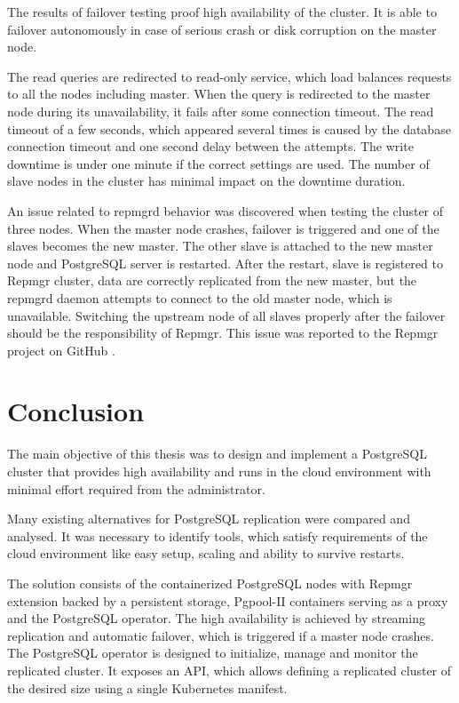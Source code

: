 \documentclass[
  digital, %
  twoside, %
  table,   %
  lof,     %
  lot,     %
]{fithesis3}
\begin{document}
The results of failover testing proof high availability of the cluster. It is able to failover autonomously in case of serious crash or disk corruption on the master node.

The read queries are redirected to read-only service, which load balances requests to all the nodes including master. When the query is redirected to the master node during its unavailability, it fails after some connection timeout.
The read timeout of a few seconds, which appeared several times is caused by the database connection timeout and one second delay between the attempts. The write downtime is under one minute if the correct settings are used. The number of slave nodes in the cluster has minimal impact on the downtime duration.

An issue related to repmgrd behavior was discovered when testing the cluster of three nodes. When the master node crashes, failover is triggered and one of the slaves becomes the new master. The other slave is attached to the new master node and PostgreSQL server is restarted. After the restart, slave is registered to Repmgr cluster, data are correctly replicated from the new master, but the repmgrd daemon attempts to connect to the old master node, which is unavailable. Switching the upstream node of all slaves properly after the failover should be the responsibility of Repmgr. This issue was reported to the Repmgr project on GitHub \cite{repmgrd_issue}.

\chapter{Conclusion} \label{chap:conclusion}
The main objective of this thesis was to design and implement a PostgreSQL cluster that provides high availability and runs in the cloud environment with minimal effort required from the administrator.

Many existing alternatives for PostgreSQL replication were compared and analysed. It was necessary to identify tools, which satisfy requirements of the cloud environment like easy setup, scaling and ability to survive restarts.

The solution consists of the containerized PostgreSQL nodes with Repmgr extension backed by a persistent storage, Pgpool-II containers serving as a proxy and the PostgreSQL operator. The high availability is achieved by streaming replication and automatic failover, which is triggered if a master node crashes. The PostgreSQL operator is designed to initialize, manage and monitor the replicated cluster. It exposes an API, which allows defining a replicated cluster of the desired size using a single Kubernetes manifest.
\end{document}
